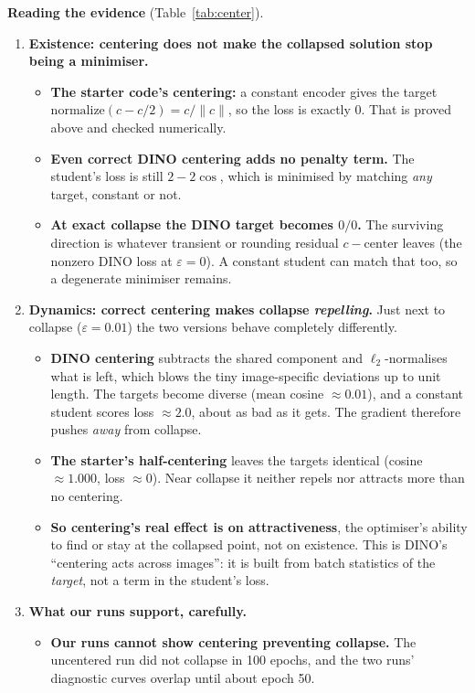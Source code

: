 \documentclass[11pt]{article}
\begin{document}
\textbf{Reading the evidence} (Table~\ref{tab:center}).
\begin{enumerate}
  \item \textbf{Existence: centering does not make the collapsed solution stop being a minimiser.}
  \begin{itemize}
    \item \textbf{The starter code's centering:} a constant encoder gives the target $\mathrm{normalize}(c-c/2)=c/\|c\|$, so the loss is exactly 0. That is proved above and checked numerically.
    \item \textbf{Even correct DINO centering adds no penalty term.} The student's loss is still $2-2\cos$, which is minimised by matching \emph{any} target, constant or not.
    \item \textbf{At exact collapse the DINO target becomes $0/0$.} The surviving direction is whatever transient or rounding residual $c-\text{center}$ leaves (the nonzero DINO loss at $\varepsilon=0$). A constant student can match that too, so a degenerate minimiser remains.
  \end{itemize}
  \item \textbf{Dynamics: correct centering makes collapse \emph{repelling}.} Just next to collapse ($\varepsilon=0.01$) the two versions behave completely differently.
  \begin{itemize}
    \item \textbf{DINO centering} subtracts the shared component and $\ell_2$-normalises what is left, which blows the tiny image-specific deviations up to unit length. The targets become diverse (mean cosine $\approx0.01$), and a constant student scores loss $\approx2.0$, about as bad as it gets. The gradient therefore pushes \emph{away} from collapse.
    \item \textbf{The starter's half-centering} leaves the targets identical (cosine $\approx1.000$, loss $\approx0$). Near collapse it neither repels nor attracts more than no centering.
    \item \textbf{So centering's real effect is on attractiveness}, the optimiser's ability to find or stay at the collapsed point, not on existence. This is DINO's ``centering acts across images'': it is built from batch statistics of the \emph{target}, not a term in the student's loss.
  \end{itemize}
  \item \textbf{What our runs support, carefully.}
  \begin{itemize}
    \item \textbf{Our runs cannot show centering preventing collapse.} The uncentered run did not collapse in 100 epochs, and the two runs' diagnostic curves overlap until about epoch 50.

\end{itemize}
\end{enumerate}
\end{document}
